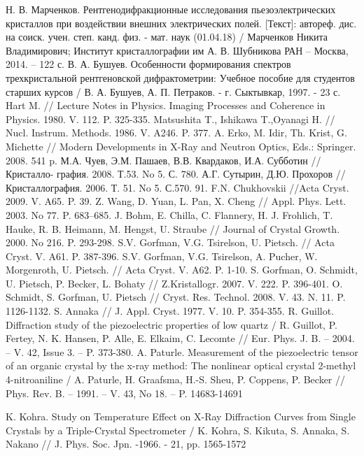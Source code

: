 \begin{thebibliography}{99}
    Н. В. Марченков. Рентгенодифракционные исследования пьезоэлектрических кристаллов
    при воздействии внешних электрических полей. [Текст]: автореф. дис. на соиск.
     учен. степ. канд. физ. - мат. наук (01.04.18) /
     Марченков Никита Владимирович; Институт кристаллографии им А. В. Шубникова РАН  – Москва, 2014. – 122 с.
     В. А. Бушуев. Особенности формирования спектров трехкристальной рентгеновской дифрактометрии:
    Учебное пособие для студентов старших курсов  / В. А. Бушуев, А. П. Петраков. - г. Сыктывкар, 1997. - 23 с.
      Hart M. // Lecture Notes in Physics. Imaging Processes and Coherence in Physics. 1980. V. 112. P. 325-335.
    Matsushita T., Ishikawa T.,Oyanagi H. // Nucl. Instrum. Methods. 1986. V. A246. P. 377.
      A. Erko, M. Idir, Th. Krist, G. Michette // Modern Developments in X-Ray and Neutron Optics, Eds.: Springer. 2008. 541 p.
    М.А. Чуев, Э.М. Пашаев, В.В. Квардаков, И.А. Субботин // Кристалло- графия. 2008. Т.53. No 5. С. 780.
А.Г. Сутырин, Д.Ю. Прохоров //Кристаллография. 2006. Т. 51. No 5. С.570. 91. F.N. Chukhovskii //Acta Cryst. 2009. V. A65. P. 39.
  Z. Wang, D. Yuan, L. Pan, X. Cheng // Appl. Phys. Lett. 2003. No 77. P. 683–685.
    J. Bohm, E. Chilla, C. Flannery, H. J. Frohlich, T. Hauke, R. B. Heimann, M. Hengst, U. Straube // Journal of Crystal Growth. 2000. No 216. P. 293-298.
  S.V. Gorfman, V.G. Tsirelson, U. Pietsch. // Acta Cryst. V. A61. P. 387-396.
  S.V. Gorfman, V.G. Tsirelson, A. Pucher, W. Morgenroth, U. Pietsch. // Acta Cryst. V. A62. P. 1-10.
  S. Gorfman, O. Schmidt, U. Pietsch, P. Becker, L. Bohaty // Z.Kristallogr. 2007. V. 222. P. 396-401.
  O. Schmidt, S. Gorfman, U. Pietsch // Cryst. Res. Technol. 2008. V. 43. N. 11. P. 1126-1132.
  S. Annaka // J. Appl. Cryst. 1977. V. 10. P. 354-355.
  R. Guillot. Diffraction study of the piezoelectric properties of low quartz
  / R. Guillot, P. Fertey, N. K. Hansen, P. Alle, E. Elkaim, C. Lecomte //
  Eur. Phys. J. B. – 2004. – V. 42, Issue 3. – P. 373-380.
  A. Paturle. Measurement of the piezoelectric tensor of an organic crystal by the x-ray method:
   The nonlinear optical crystal 2-methyl 4-nitroaniline / A. Paturle, H. Graafsma,
    H.-S. Sheu, P. Coppens, P. Becker // Phys. Rev. B. – 1991. – V. 43, No 18. – P. 14683-14691

      K. Kohra. Study on Temperature Effect on X-Ray
       Diffraction Curves from Single Crystals by a Triple-Crystal Spectrometer  /
       K. Kohra, S. Kikuta, S. Annaka, S. Nakano // J. Phys. Soc. Jpn. -1966. - 21, pp. 1565-1572
\end{thebibliography}
